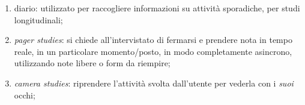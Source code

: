 \begin{enumerate}
	\item diario: utilizzato per raccogliere informazioni su attivit\`a sporadiche, per studi longitudinali;
	\item \textit{pager studies}: si chiede all'intervistato di fermarsi e prendere nota in tempo reale, in un particolare momento/posto, in modo completamente asincrono, utilizzando note libere o form da riempire;
	\item \textit{camera studies}: riprendere l'attivit\`a svolta dall'utente per vederla con i \textit{suoi} occhi;
\end{enumerate}